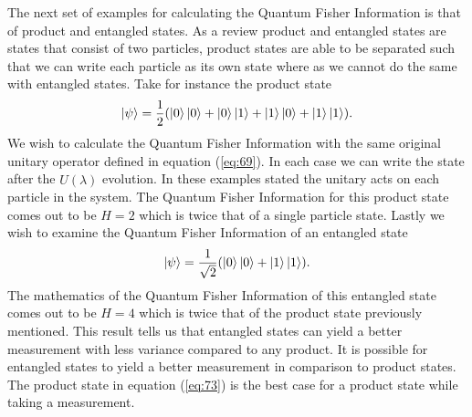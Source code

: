 \documentclass[twocolumn]{article}
\begin{document}
The next set of examples for calculating the Quantum Fisher Information is that of product and entangled states. As a review product and entangled states are states that consist of two particles, product states are able to be separated such that we can write each particle as its own state where as we cannot do the same with entangled states. Take for instance the product state 
\begin{equation} \label{eq:73}
\ket{\psi}=\frac{1}{2}(\ket{0}\ket{0}+\ket{0}\ket{1}+\ket{1}\ket{0}+\ket{1}\ket{1}).
\end{equation}
We wish to calculate the Quantum Fisher Information with the same original unitary operator defined in equation (\ref{eq:69}). In each case we can write the state after the $\hat{U}(\lambda)$ evolution. In these examples stated the unitary acts on each particle in the system. The Quantum Fisher Information for this product state comes out to be $H=2$ which is twice that of a single particle state. Lastly we wish to examine the Quantum Fisher Information of an entangled state
\begin{equation} \label{eq:74}
\ket{\psi}=\frac{1}{\sqrt{2}}(\ket{0}\ket{0}+\ket{1}\ket{1}).
\end{equation}
The mathematics of the Quantum Fisher Information of this entangled state comes out to be $H=4$ which is twice that of the product state previously mentioned. This result tells us that entangled states can yield a better measurement with less variance compared to any product. It is possible for entangled states to yield a better measurement in comparison to product states. The product state in equation (\ref{eq:73}) is the best case for a product state while taking a measurement.
\end{document}
